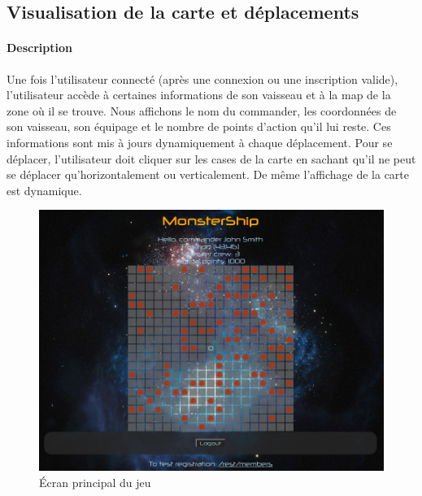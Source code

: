 \documentclass[a4paper,11pt]{report}
\begin{document}
    \subsection{Visualisation de la carte et déplacements}

      \paragraph{Description}
        Une fois l'utilisateur connecté (après une connexion ou une inscription valide), l'utilisateur accède à certaines informations de son vaisseau et à la map de la zone où il se trouve.
        Nous affichons le nom du commander, les coordonnées de son vaisseau, son équipage et le nombre de points d'action qu'il lui reste. Ces informations sont mis à jours dynamiquement à chaque déplacement.
        Pour se déplacer, l'utilisateur doit cliquer sur les cases de la carte en sachant qu'il ne peut se déplacer qu'horizontalement ou verticalement. De même l'affichage de la carte est dynamique.
        \begin{figure}[H]
          \begin{center}
            \includegraphics[width=.8\textwidth]{images/home.png}
            \caption{Écran principal du jeu}
            \label{fig:ec_home}
          \end{center}
        \end{figure}
        
\end{document}
